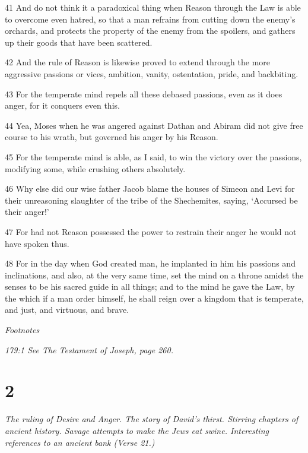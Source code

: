 \par 41 And do not think it a paradoxical thing when Reason through the Law is able to overcome even hatred, so that a man refrains from cutting down the enemy's orchards, and protects the property of the enemy from the spoilers, and gathers up their goods that have been scattered.

\par 42 And the rule of Reason is likewise proved to extend through the more aggressive passions or vices, ambition, vanity, ostentation, pride, and backbiting.

\par 43 For the temperate mind repels all these debased passions, even as it does anger, for it conquers even this.

\par 44 Yea, Moses when he was angered against Dathan and Abiram did not give free course to his wrath, but governed his anger by his Reason.

\par 45 For the temperate mind is able, as I said, to win the victory over the passions, modifying some, while crushing others absolutely.

\par 46 Why else did our wise father Jacob blame the houses of Simeon and Levi for their unreasoning slaughter of the tribe of the Shechemites, saying, ‘Accursed be their anger!’

\par 47 For had not Reason possessed the power to restrain their anger he would not have spoken thus.

\par 48 For in the day when God created man, he implanted in him his passions and inclinations, and also, at the very same time, set the mind on a throne amidst the senses to be his sacred guide in all things; and to the mind he gave the Law, by the which if a man order himself, he shall reign over a kingdom that is temperate, and just, and virtuous, and brave.

\par \textit{Footnotes}

\par \textit{179:1 See The Testament of Joseph, page 260.}

\chapter{2}

\par \textit{The ruling of Desire and Anger. The story of David's thirst. Stirring chapters of ancient history. Savage attempts to make the Jews eat swine. Interesting references to an ancient bank (Verse 21.)}

